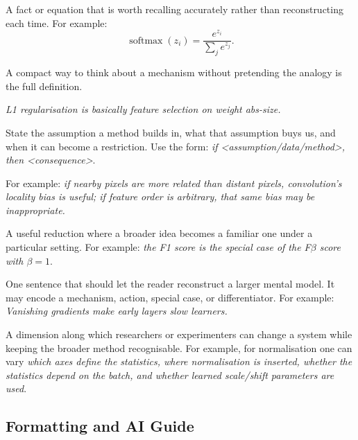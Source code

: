 \begin{calloutmemorise}
A fact or equation that is worth recalling accurately rather than reconstructing each time.
For example:
\[
\operatorname{softmax}(z_i)=\frac{e^{z_i}}{\sum_j e^{z_j}}.
\]
\end{calloutmemorise}

\begin{calloutintuition}
A compact way to think about a mechanism without pretending the analogy is the full definition.

\textit{L1 regularisation is basically feature selection on weight abs-size.}
\end{calloutintuition}

\begin{calloutbias}
State the assumption a method builds in, what that assumption buys us, and when it can become a restriction.
Use the form: \textit{if \textless assumption/data/method\textgreater, then \textless consequence\textgreater}.

For example: \textit{if nearby pixels are more related than distant pixels, convolution's locality bias is useful; if feature order is arbitrary, that same bias may be inappropriate.}
\end{calloutbias}

\begin{calloutspecialcase}
A useful reduction where a broader idea becomes a familiar one under a particular setting.
For example: \textit{the F1 score is the special case of the F$\beta$ score with $\beta=1$}.
\end{calloutspecialcase}

\begin{calloutmemoryhook}
One sentence that should let the reader reconstruct a larger mental model.
It may encode a mechanism, action, special case, or differentiator.
For example: \textit{Vanishing gradients make early layers slow learners.}
\end{calloutmemoryhook}

\begin{calloutdegreeofexperiment}
A dimension along which researchers or experimenters can change a system while keeping the broader method recognisable.
For example, for normalisation one can vary \textit{which axes define the statistics, where normalisation is inserted, whether the statistics depend on the batch, and whether learned scale/shift parameters are used}.
\end{calloutdegreeofexperiment}

\subsection*{Formatting and AI Guide}

